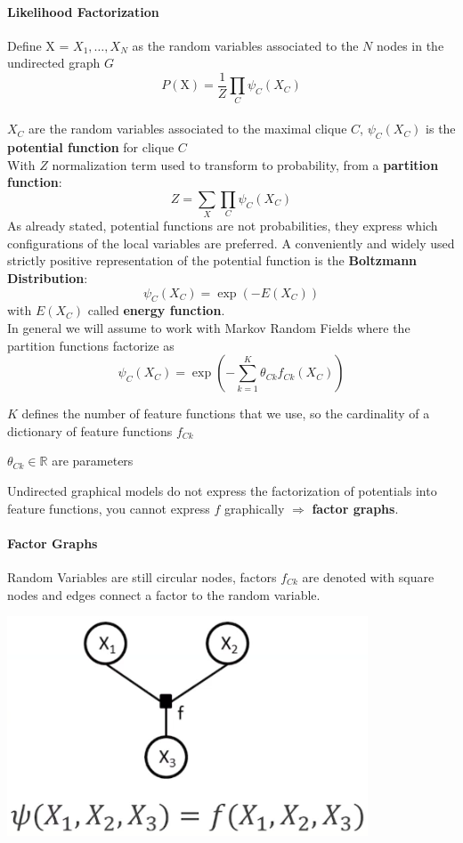 \documentclass[10pt]{report}
\begin{document}
\paragraph{Likelihood Factorization} Define X = $X_1,\ldots, X_N$ as the random variables associated to the $N$ nodes in the undirected graph $G$
$$P(\text{X}) = \frac{1}{Z}\prod_C \psi_C(X_C)$$\\
$X_C$ are the random variables associated to the maximal clique $C$, $\psi_C(X_C)$ is the \textbf{potential function} for clique $C$\\
With $Z$ normalization term used to transform to probability, from a \textbf{partition function}:
$$Z = \sum_X\prod_C\psi_C(X_C)$$
As already stated, potential functions are not probabilities, they express which configurations of the local variables are preferred. A conveniently and widely used strictly positive representation of the potential function is the \textbf{Boltzmann Distribution}:
$$\psi_C(X_C)=\exp\left(-E(X_C)\right)$$
with $E(X_C)$ called \textbf{energy function}.\\
In general we will assume to work with Markov Random Fields where the partition functions factorize as $$\psi_C(X_C) = \exp\left(-\sum_{k=1}^K\theta_{Ck}f_{Ck}(X_C)\right)$$
\begin{list}{}{}
	\item $K$ defines the number of feature functions that we use, so the cardinality of a dictionary of feature functions $f_{Ck}$
	\item $\theta_{Ck}\in\mathbb{R}$ are parameters
\end{list}
Undirected graphical models do not express the factorization of potentials into feature functions, you cannot express $f$ graphically $\Rightarrow$ \textbf{factor graphs}.
\pagebreak
\paragraph{Factor Graphs} Random Variables are still circular nodes, factors $f_{Ck}$ are denoted with square nodes and edges connect a factor to the random variable.
\begin{center}
	\includegraphics[scale=0.5]{34.png}
\end{center}
\end{document}
